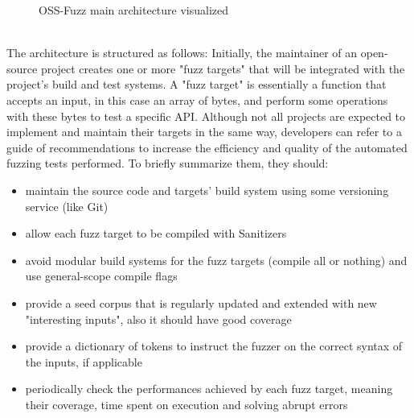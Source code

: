 \newpage
\begin{figure}[h]
\caption{OSS-Fuzz main architecture visualized \cite{ossfuzz_docs}}
\label{fig:ossfuzz_architecture}
\end{figure}
\ \\
The architecture is structured as follows:
\newline \newline
Initially, the maintainer of an open-source project creates one or more "fuzz targets" that will be integrated with the project's build and test systems. \cite{libfuzzer_docs}
\newline
A "fuzz target" is essentially a function that accepts an input, in this case an array of bytes, and perform some operations with these bytes to test a specific API.
\newline
Although not all projects are expected to implement and maintain their targets in the same way, developers can refer to a guide of recommendations to increase the efficiency and quality of the automated fuzzing tests performed.
\newline \newline
To briefly summarize them, they should:
\begin{itemize}
    \item maintain the source code and targets' build system using some versioning service (like Git)
    \item allow each fuzz target to be compiled with Sanitizers
    \item avoid modular build systems for the fuzz targets (compile all or nothing) and use general-scope compile flags
    \item provide a seed corpus that is regularly updated and extended with new "interesting inputs", also it should have good coverage
    \item provide a dictionary of tokens to instruct the fuzzer on the correct syntax of the inputs, if applicable
    \item periodically check the performances achieved by each fuzz target, meaning their coverage, time spent on execution and solving abrupt errors
\end{itemize}


